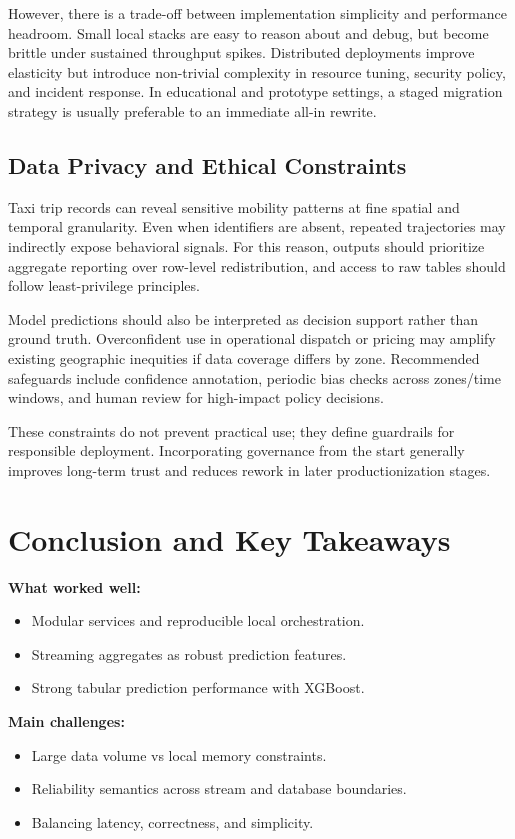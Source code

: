 \documentclass[conference]{IEEEtran}
\begin{document}
However, there is a trade-off between implementation simplicity and performance headroom. Small local stacks are easy to reason about and debug, but become brittle under sustained throughput spikes. Distributed deployments improve elasticity but introduce non-trivial complexity in resource tuning, security policy, and incident response. In educational and prototype settings, a staged migration strategy is usually preferable to an immediate all-in rewrite.

\subsection{Data Privacy and Ethical Constraints}
Taxi trip records can reveal sensitive mobility patterns at fine spatial and temporal granularity. Even when identifiers are absent, repeated trajectories may indirectly expose behavioral signals. For this reason, outputs should prioritize aggregate reporting over row-level redistribution, and access to raw tables should follow least-privilege principles.

Model predictions should also be interpreted as decision support rather than ground truth. Overconfident use in operational dispatch or pricing may amplify existing geographic inequities if data coverage differs by zone. Recommended safeguards include confidence annotation, periodic bias checks across zones/time windows, and human review for high-impact policy decisions.

These constraints do not prevent practical use; they define guardrails for responsible deployment. Incorporating governance from the start generally improves long-term trust and reduces rework in later productionization stages.

\section{Conclusion and Key Takeaways}
\textbf{What worked well:}
\begin{itemize}[leftmargin=1.5em]
    \item Modular services and reproducible local orchestration.
    \item Streaming aggregates as robust prediction features.
    \item Strong tabular prediction performance with XGBoost.
\end{itemize}

\textbf{Main challenges:}
\begin{itemize}[leftmargin=1.5em]
    \item Large data volume vs local memory constraints.
    \item Reliability semantics across stream and database boundaries.
    \item Balancing latency, correctness, and simplicity.
\end{itemize}
\end{document}
